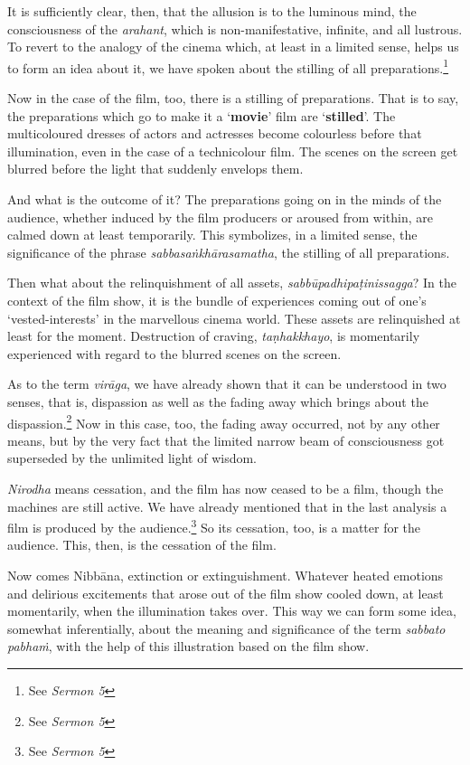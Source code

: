 It is sufficiently clear, then, that the allusion is to the luminous mind, the consciousness of the \emph{arahant}, which is non-manifestative, infinite, and all lustrous. To revert to the analogy of the cinema which, at least in a limited sense, helps us to form an idea about it, we have spoken about the stilling of all preparations.\footnote{See \emph{Sermon 5}}

Now in the case of the film, too, there is a stilling of preparations. That is to say, the preparations which go to make it a `\textbf{movie}' film are `\textbf{stilled}'. The multicoloured dresses of actors and actresses become colourless before that illumination, even in the case of a technicolour film. The scenes on the screen get blurred before the light that suddenly envelops them.

And what is the outcome of it? The preparations going on in the minds of the audience, whether induced by the film producers or aroused from within, are calmed down at least temporarily. This symbolizes, in a limited sense, the significance of the phrase \emph{sabbasaṅkhārasamatha}, the stilling of all preparations.

Then what about the relinquishment of all assets, \emph{sabbūpadhipaṭinissagga}? In the context of the film show, it is the bundle of experiences coming out of one's `vested-interests' in the marvellous cinema world. These assets are relinquished at least for the moment. Destruction of craving, \emph{taṇhakkhayo}, is momentarily experienced with regard to the blurred scenes on the screen.

As to the term \emph{virāga}, we have already shown that it can be understood in two senses, that is, dispassion as well as the fading away which brings about the dispassion.\footnote{See \emph{Sermon 5}} Now in this case, too, the fading away occurred, not by any other means, but by the very fact that the limited narrow beam of consciousness got superseded by the unlimited light of wisdom.

\emph{Nirodha} means cessation, and the film has now ceased to be a film, though the machines are still active. We have already mentioned that in the last analysis a film is produced by the audience.\footnote{See \emph{Sermon 5}} So its cessation, too, is a matter for the audience. This, then, is the cessation of the film.

Now comes Nibbāna, extinction or extinguishment. Whatever heated emotions and delirious excitements that arose out of the film show cooled down, at least momentarily, when the illumination takes over. This way we can form some idea, somewhat inferentially, about the meaning and significance of the term \emph{sabbato pabhaṁ}, with the help of this illustration based on the film show.

